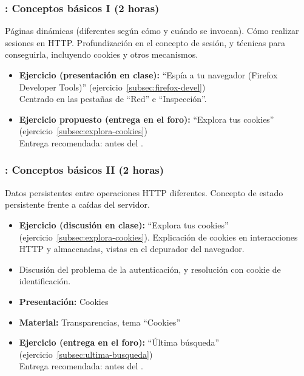 \documentclass[a4paper,12pt]{article}
\begin{document}
\subsubsection{\juevesB: Conceptos básicos I (2 horas)}
\label{cal:juevesB}

Páginas dinámicas (diferentes según cómo y cuándo se invocan). Cómo realizar sesiones en HTTP. Profundización en el concepto de sesión, y técnicas para conseguirla, incluyendo cookies y otros mecanismos.

\begin{itemize}
\item \textbf{Ejercicio (presentación en clase):} ``Espía a tu navegador (Firefox Developer Tools)'' (ejercicio~\ref{subsec:firefox-devel}) \\
  Centrado en las pestañas de ``Red'' e ``Inspección''.
\item \textbf{Ejercicio propuesto (entrega en el foro):} ``Explora tus cookies'' (ejercicio~\ref{subsec:explora-cookies}) \\
  Entrega recomendada: antes del \juevesC.
\end{itemize}


\subsubsection{\juevesC: Conceptos básicos II (2 horas)}
\label{cal:juevesC}

Datos persistentes entre operaciones HTTP diferentes. Concepto de estado persistente frente a caídas del servidor.

\begin{itemize}
\item \textbf{Ejercicio (discusión en clase):}  ``Explora tus cookies'' (ejercicio~\ref{subsec:explora-cookies}).
  Explicación de cookies en interacciones HTTP y almacenadas, vistas en el depurador del navegador.
\item Discusión del problema de la autenticación, y resolución con cookie de identificación.
\item \textbf{Presentación:} Cookies
\item \textbf{Material:} Transparencias, tema ``Cookies''
\item \textbf{Ejercicio (entrega en el foro):} ``Última búsqueda'' (ejercicio~\ref{subsec:ultima-busqueda}) \\
  Entrega recomendada: antes del \juevesD. \\
\end{itemize}
\end{document}
